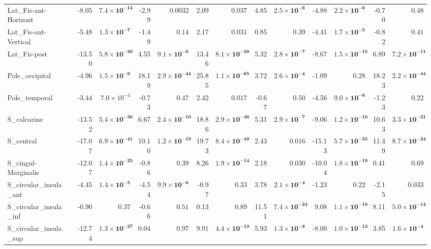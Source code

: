 {\begin{longtable}{llrrrrrrrrrrrr}
Lat\_Fis-ant-Horizont &  & -8.05 & $\mathbf{7.4{\times}10^{-14}}$ & -2.99 & $0.0032$ & 2.09 & $0.037$ & 4.85 & $\mathbf{2.5{\times}10^{-6}}$ & -4.88 & $\mathbf{2.2{\times}10^{-6}}$ & -0.70 & $0.48$ \\
Lat\_Fis-ant-Vertical &  & -5.48 & $\mathbf{1.3{\times}10^{-7}}$ & -1.49 & $0.14$ & 2.17 & $0.031$ & 0.85 & $0.39$ & -4.41 & $\mathbf{1.7{\times}10^{-5}}$ & -0.82 & $0.41$ \\
Lat\_Fis-post &  & -13.50 & $\mathbf{5.8{\times}10^{-30}}$ & 4.55 & $\mathbf{9.1{\times}10^{-6}}$ & 13.46 & $\mathbf{8.1{\times}10^{-30}}$ & 5.32 & $\mathbf{2.8{\times}10^{-7}}$ & -8.67 & $\mathbf{1.5{\times}10^{-15}}$ & 6.89 & $\mathbf{7.2{\times}10^{-11}}$ \\
Pole\_occipital &  & -4.96 & $\mathbf{1.5{\times}10^{-6}}$ & 18.19 & $\mathbf{2.9{\times}10^{-44}}$ & 25.85 & $\mathbf{1.1{\times}10^{-65}}$ & 3.72 & $\mathbf{2.6{\times}10^{-4}}$ & -1.09 & $0.28$ & 18.23 & $\mathbf{2.2{\times}10^{-44}}$ \\
Pole\_temporal &  & -3.44 & $7.0{\times}10^{-4}$ & -0.73 & $0.47$ & 2.42 & $0.017$ & -0.67 & $0.50$ & -4.56 & $\mathbf{9.0{\times}10^{-6}}$ & -1.23 & $0.22$ \\
S\_calcarine &  & -13.52 & $\mathbf{5.4{\times}10^{-30}}$ & 6.67 & $\mathbf{2.4{\times}10^{-10}}$ & 18.86 & $\mathbf{2.9{\times}10^{-46}}$ & 5.31 & $\mathbf{2.9{\times}10^{-7}}$ & -9.06 & $\mathbf{1.2{\times}10^{-16}}$ & 10.63 & $\mathbf{3.3{\times}10^{-21}}$ \\
S\_central &  & -17.07 & $\mathbf{6.9{\times}10^{-41}}$ & 10.10 & $\mathbf{1.2{\times}10^{-19}}$ & 19.73 & $\mathbf{8.4{\times}10^{-49}}$ & 2.43 & $0.016$ & -15.13 & $\mathbf{5.7{\times}10^{-35}}$ & 11.49 & $\mathbf{8.7{\times}10^{-24}}$ \\
S\_cingul-Marginalis &  & -12.07 & $\mathbf{1.4{\times}10^{-25}}$ & -0.86 & $0.39$ & 8.26 & $\mathbf{1.9{\times}10^{-14}}$ & 2.18 & $0.030$ & -10.04 & $\mathbf{1.8{\times}10^{-19}}$ & 0.41 & $0.69$ \\
S\_circular\_insula\_ant &  & -4.45 & $\mathbf{1.4{\times}10^{-5}}$ & -4.54 & $\mathbf{9.9{\times}10^{-6}}$ & -0.97 & $0.33$ & 3.78 & $\mathbf{2.1{\times}10^{-4}}$ & -1.23 & $0.22$ & -2.15 & $0.033$ \\
S\_circular\_insula\_inf &  & -0.90 & $0.37$ & -0.66 & $0.51$ & 0.13 & $0.89$ & 11.51 & $\mathbf{7.4{\times}10^{-24}}$ & 9.08 & $\mathbf{1.1{\times}10^{-16}}$ & 8.11 & $\mathbf{5.0{\times}10^{-14}}$ \\
S\_circular\_insula\_sup &  & -12.74 & $\mathbf{1.3{\times}10^{-27}}$ & 0.04 & $0.97$ & 9.91 & $\mathbf{4.4{\times}10^{-19}}$ & 5.93 & $\mathbf{1.3{\times}10^{-8}}$ & -8.00 & $\mathbf{1.0{\times}10^{-13}}$ & 3.85 & $\mathbf{1.6{\times}10^{-4}}$ \\

\end{longtable}}
